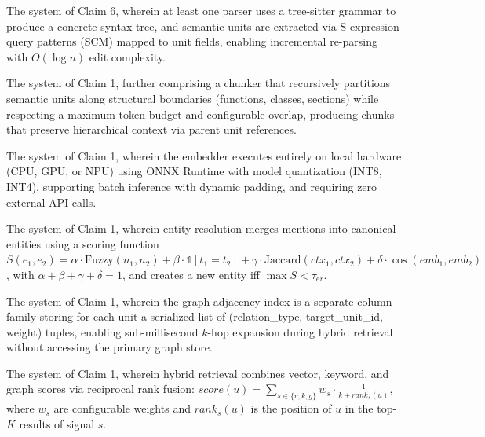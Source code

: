 \begin{claim}
\label{claim:tree-sitter}
The system of Claim 6, wherein at least one parser uses a tree-sitter grammar to produce a concrete syntax tree, and semantic units are extracted via S-expression query patterns (SCM) mapped to unit fields, enabling incremental re-parsing with $O(\log n)$ edit complexity.
\end{claim}

\begin{claim}
\label{claim:chunking}
The system of Claim 1, further comprising a chunker that recursively partitions semantic units along structural boundaries (functions, classes, sections) while respecting a maximum token budget and configurable overlap, producing chunks that preserve hierarchical context via parent unit references.
\end{claim}

\begin{claim}
\label{claim:local-embed}
The system of Claim 1, wherein the embedder executes entirely on local hardware (CPU, GPU, or NPU) using ONNX Runtime with model quantization (INT8, INT4), supporting batch inference with dynamic padding, and requiring zero external API calls.
\end{claim}

\begin{claim}
\label{claim:entity-resolution}
The system of Claim 1, wherein entity resolution merges mentions into canonical entities using a scoring function $S(e_1, e_2) = \alpha \cdot \text{Fuzzy}(n_1, n_2) + \beta \cdot \mathbb{1}[t_1 = t_2] + \gamma \cdot \text{Jaccard}(ctx_1, ctx_2) + \delta \cdot \cos(emb_1, emb_2)$, with $\alpha+\beta+\gamma+\delta=1$, and creates a new entity iff $\max S < \tau_{er}$.
\end{claim}

\begin{claim}
\label{claim:adj-index}
The system of Claim 1, wherein the graph adjacency index is a separate column family storing for each unit a serialized list of (relation\_type, target\_unit\_id, weight) tuples, enabling sub-millisecond $k$-hop expansion during hybrid retrieval without accessing the primary graph store.
\end{claim}

\begin{claim}
\label{claim:hybrid-rrf}
The system of Claim 1, wherein hybrid retrieval combines vector, keyword, and graph scores via reciprocal rank fusion: $score(u) = \sum_{s \in \{v,k,g\}} w_s \cdot \frac{1}{k + rank_s(u)}$, where $w_s$ are configurable weights and $rank_s(u)$ is the position of $u$ in the top-$K$ results of signal $s$.
\end{claim}

